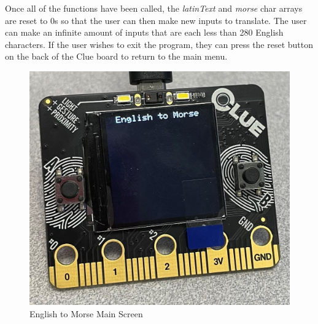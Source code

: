 \documentclass[12pt]{article}
\begin{document}
Once all of the functions have been called, the \emph{latinText} and \emph{morse} char arrays are reset to 0s so that the user can then make new inputs to translate. The user can make an infinite amount of inputs that are each less than 280 English characters. If the user wishes to exit the program, they can press the reset button on the back of the Clue board to return to the main menu.
\begin{figure}[!ht]
\centering
\includegraphics[width=4 in]{images/EtoM.jpg}
\caption{English to Morse Main Screen}
\label{EtoM}
\end{figure}

\FloatBarrier
\end{document}
